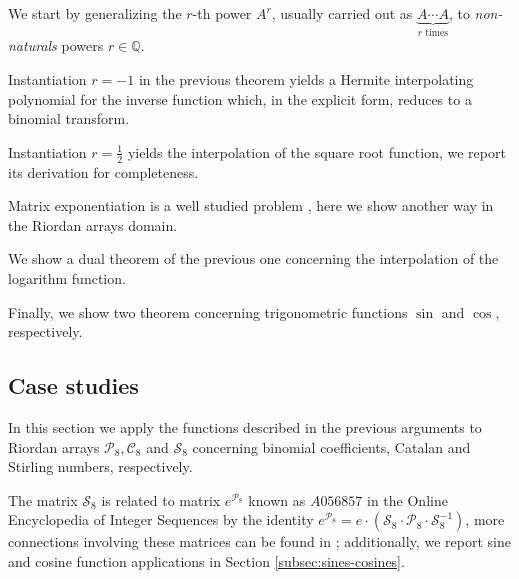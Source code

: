 We start by generalizing the $r$-th power $A^{r}$, usually carried out
as $\underbrace{A\cdots A}_{r\text{ times}}$, to \textit{non-naturals} powers
$r\in\mathbb{Q}$.



Instantiation $r=-1$ in the previous theorem yields a Hermite interpolating
polynomial for the inverse function which, in the explicit form, reduces to
a binomial transform.



Instantiation $r=\frac{1}{2}$ yields the interpolation of the square root function,
we report its derivation for completeness.



Matrix exponentiation is a well studied problem \cite{MOLERLOAN2003}, here
we show another way in the Riordan arrays domain.



We show a dual theorem of the previous one concerning the interpolation of the
logarithm function.



Finally, we show two theorem concerning trigonometric functions $\sin$ and
$\cos$, respectively.





\subsection{Case studies}

In this section we apply the functions described in the previous arguments to
Riordan arrays $\mathcal{P}_{8}, \mathcal{C}_{8}$ and $\mathcal{S}_{8}$
concerning binomial coefficients, Catalan and Stirling numbers, respectively.









The matrix $\mathcal{S}_{8}$ is related to matrix $e^{\mathcal{P}_{8}}$ known as
$A056857$ in the Online Encyclopedia of Integer Sequences \citep{OEIS} by the
identity $ e^{\mathcal{P}_{8}}=e\cdot\left(\mathcal{S}_{8}\cdot
\mathcal{P}_{8}\cdot \mathcal{S}_{8}^{-1}\right)$, more connections
involving these matrices can be found in \citep{CHEON200149}; additionally, we report
sine and cosine function applications in Section \ref{subsec:sines-cosines}.

